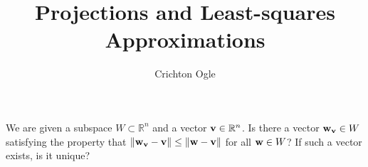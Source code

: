 \documentclass{ximera}
\title{Projections and Least-squares Approximations}
\author{Crichton Ogle}
\begin{document}
\begin{abstract}
\end{abstract}
\maketitle

We are given a subspace $W\subset\mathbb R^n$ and a vector ${\bf v}\in\mathbb R^n$. Is there a vector ${\bf w}_{\bf v}\in W$ satisfying the property that $\|{\bf w}_{\bf v} - {\bf v}\|\le \|{\bf w} - {\bf v}\|$ for all ${\bf w}\in W$?  If such a vector exists, is it unique?
\end{document}
